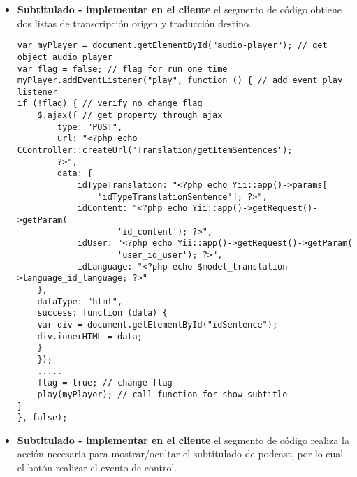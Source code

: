 \begin{itemize}

\item \textbf{Subtitulado - implementar en el cliente} el segmento de código
obtiene dos listas de transcripción origen y traducción destino.

\begin{lstlisting}[caption={Llenado de elemento en subtitulado.}, label={lst:fillSubtitle}]
var myPlayer = document.getElementById("audio-player"); // get object audio player
var flag = false; // flag for run one time
myPlayer.addEventListener("play", function () { // add event play listener
if (!flag) { // verify no change flag
    $.ajax({ // get property through ajax
        type: "POST",
        url: "<?php echo CController::createUrl('Translation/getItemSentences');
        ?>",
        data: {
            idTypeTranslation: "<?php echo Yii::app()->params[
                'idTypeTranslationSentence']; ?>",
            idContent: "<?php echo Yii::app()->getRequest()->getParam(
                    'id_content'); ?>",
            idUser: "<?php echo Yii::app()->getRequest()->getParam(
                    'user_id_user'); ?>",
            idLanguage: "<?php echo $model_translation->language_id_language; ?>"
    },
    dataType: "html",
    success: function (data) {
    var div = document.getElementById("idSentence");
    div.innerHTML = data;
    }
    });
    .....
    flag = true; // change flag
    play(myPlayer); // call function for show subtitle
}
}, false);
\end{lstlisting}

\item \textbf{Subtitulado - implementar en el cliente} el segmento de código
realiza la acción necesaria para mostrar/ocultar el subtitulado de podcast,
por lo cual el botón realizar el evento de control.


\end{itemize}
